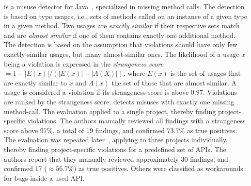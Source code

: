\DMMC is a misuse detector for Java~\cite{MBM10}, specialized in missing method calls.
The detection is based on type usages, i.e., sets of methods called on an instance of a given type in a given method.
Two usages are \emph{exactly similar} if their respective sets match and are \emph{almost similar} if one of them contains exactly one additional method.
The detection is based on the assumption that violations should have only few exactly-similar usages, but many almost-similar ones.
The likelihood of a usage $x$ being a violation is expressed in the \emph{strangeness score} $= 1 - |E(x)| / (|E(x)| + |A(X)|)$, where $E(x)$ is the set of usages that are exactly similar to $x$ and $A(x)$ the set of those that are almost similar.
A usage is considered a violation if its strangeness score is above $0.97$.
Violations are ranked by the strangeness score.
\DMMC detects misuses with exactly one missing method-call.
The evaluation applied \DMMC to a single project, thereby finding project-specific violations.
The authors manually reviewed all findings with a strangeness score above 97\%, a total of 19 findings, and confirmed 73.7\% as true positives.
The evaluation was repeated later~\cite{MM13}, applying \DMMC to three projects individually, thereby finding project-specific violations for a predefined set of APIs.
The authors report that they manually reviewed approximately 30 findings, and confirmed 17 ($\approx 56.7\%$) as true positives.
Others were classified as workarounds for bugs inside a used API.

\vspace{0.03in}

